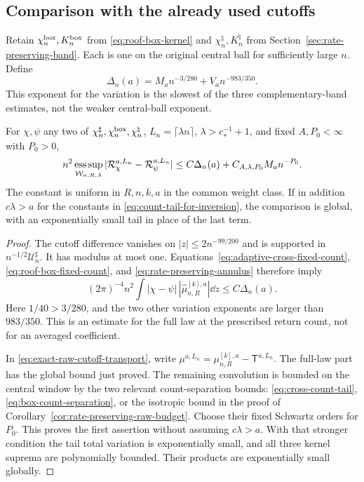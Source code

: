 \subsection{Comparison with the already used cutoffs}
Retain $\chi_n^{\rm box},K_n^{\rm box}$ from
\eqref{eq:roof-box-kernel} and
$\chi_n^\natural,K_n^\natural$ from
Section~\ref{sec:rate-preserving-band}. Each is one on the original
central ball for sufficiently large $n$. Define
\begin{equation}\label{eq:raw-cutoff-rate}
 \Delta_n(a)=M_an^{-3/280}+V_an^{-983/350}.
\end{equation}
This exponent for the variation is the slowest of the three
complementary-band estimates, not the weaker central-ball exponent.

\begin{theorem}
\label{thm:coherent-raw-cutoff-rate}
For $\chi,\psi$ any two of
$\chi_n^\sharp,\chi_n^{\rm box},\chi_n^\natural$,
$L_n=\lceil\lambda n\rceil$, $\lambda>c_*^{-1}+1$, and fixed
$A,P_0<\infty$ with $P_0>0$,
\begin{align}
 n^2\mathop{\rm ess\,sup}_{\mathcal W_{n,R,A}}
   |\mathcal R_\chi^{a,L_n}-\mathcal R_\psi^{a,L_n}|
       \le C\Delta_n(a)+C_{A,\lambda,P_0}M_an^{-P_0}.
 \label{eq:coherent-raw-cutoff-rate}
\end{align}
The constant is uniform in $R,n,k,a$ in the common weight class.
If in addition $c\lambda>a$ for the constants in
\eqref{eq:count-tail-for-inversion}, the comparison is global, with
an exponentially small tail in place of the last term.
\end{theorem}
\begin{proof}
The cutoff difference vanishes on $|z|\le2n^{-99/200}$ and is
supported in $n^{-1/2}\mathcal U_n^\sharp$. It has modulus at most
one. Equations~\eqref{eq:adaptive-cross-fixed-count},
\eqref{eq:roof-box-fixed-count}, and
\eqref{eq:rate-preserving-annulus} therefore imply
\[
 (2\pi)^{-4}n^2\int |\chi-\psi|\,
                         |\widehat\mu^{[k],a}_{n,R}|\dd z
                       \le C\Delta_n(a).
\]
Here $1/40>3/280$, and the two other variation exponents are larger
than $983/350$. This is an estimate for the full law at the prescribed
return count, not for an averaged coefficient.

In \eqref{eq:exact-raw-cutoff-transport}, write
$\mu^{a,L_n}=\mu^{[k],a}_{n,R}-\mathsf T^{a,L_n}$. The full-law
part has the global bound just proved. The remaining convolution
is bounded on the central window by the two relevant count-separation
bounds: \eqref{eq:cross-count-tail}, \eqref{eq:box-count-separation},
or the isotropic bound in the proof of
Corollary~\ref{cor:rate-preserving-raw-budget}. Choose their fixed
Schwartz orders for $P_0$. This proves the first assertion without
assuming $c\lambda>a$. With that stronger condition the tail total
variation is exponentially small, and all three kernel suprema are
polynomially bounded. Their products are exponentially small globally.
\end{proof}

